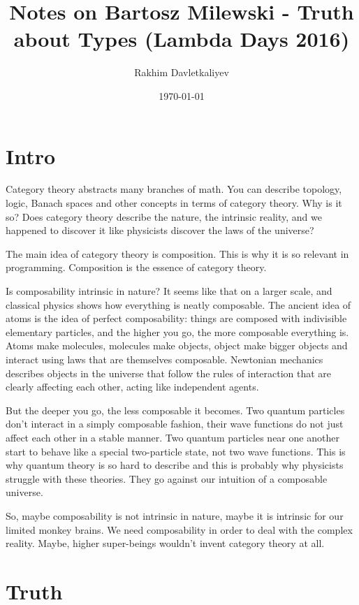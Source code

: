 \documentclass[11pt]{article}
\author{Rakhim Davletkaliyev}
\date{\today}
\title{Notes on Bartosz Milewski - Truth about Types (Lambda Days 2016)}
\begin{document}
\maketitle
\tableofcontents


\section{Intro}
\label{sec:org6d8c16f}

Category theory abstracts many branches of math. You can describe topology, logic, Banach spaces and other concepts in terms of category theory. Why is it so? Does category theory describe the nature, the intrinsic reality, and we happened to discover it like physicists discover the laws of the universe?

The main idea of category theory is composition. This is why it is so relevant in programming. Composition is the essence of category theory.

Is composability intrinsic in nature? It seems like that on a larger scale, and classical physics shows how everything is neatly composable. The ancient idea of atoms is the idea of perfect composability: things are composed with indivisible elementary particles, and the higher you go, the more composable everything is. Atoms make molecules, molecules make objects, object make bigger objects and interact using laws that are themselves composable. Newtonian mechanics describes objects in the universe that follow the rules of interaction that are clearly affecting each other, acting like independent agents.

But the deeper you go, the less composable it becomes. Two quantum particles don't interact in a simply composable fashion, their wave functions do not just affect each other in a stable manner. Two quantum particles near one another start to behave like a special two-particle state, not two wave functions. This is why quantum theory is so hard to describe and this is probably why physicists struggle with these theories. They go against our intuition of a composable universe.

So, maybe composability is not intrinsic in nature, maybe it is intrinsic for our limited monkey brains. We need composability in order to deal with the complex reality. Maybe, higher super-beings wouldn't invent category theory at all.

\section{Truth}
\label{sec:org0633929}
\end{document}
